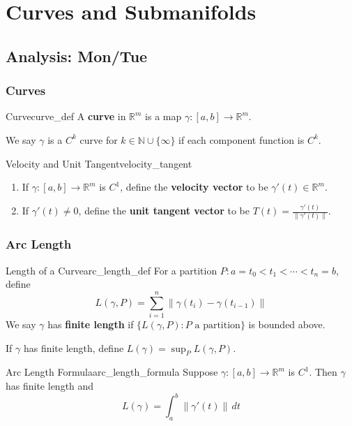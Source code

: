 \documentclass[11pt, letterpaper, openany]{book}
\begin{document}
\chapter{Curves and Submanifolds}

\section{Analysis: Mon/Tue}

\subsection{Curves}

\begin{defn}{Curve}{curve_def}
A \textbf{curve} in $\mathbb{R}^m$ is a map $\gamma: [a,b] \to \mathbb{R}^m$.

We say $\gamma$ is a $C^k$ curve for $k \in \mathbb{N} \cup \{\infty\}$ if each component function is $C^k$.
\end{defn}

\begin{defn}{Velocity and Unit Tangent}{velocity_tangent}
\begin{enumerate}
    \item If $\gamma: [a,b] \to \mathbb{R}^m$ is $C^1$, define the \textbf{velocity vector} to be $\gamma'(t) \in \mathbb{R}^m$.
    \item If $\gamma'(t) \neq 0$, define the \textbf{unit tangent vector} to be $T(t) = \frac{\gamma'(t)}{\|\gamma'(t)\|}$.
\end{enumerate}
\end{defn}

\subsection{Arc Length}

\begin{defn}{Length of a Curve}{arc_length_def}
For a partition $P: a = t_0 < t_1 < \cdots < t_n = b$, define
\[L(\gamma, P) = \sum_{i=1}^n \|\gamma(t_i) - \gamma(t_{i-1})\|\]
We say $\gamma$ has \textbf{finite length} if $\{L(\gamma, P) : P \text{ a partition}\}$ is bounded above.

If $\gamma$ has finite length, define $L(\gamma) = \sup_P L(\gamma, P)$.
\end{defn}

\begin{thm}{Arc Length Formula}{arc_length_formula}
Suppose $\gamma: [a,b] \to \mathbb{R}^m$ is $C^1$. Then $\gamma$ has finite length and
\[L(\gamma) = \int_a^b \|\gamma'(t)\| \, dt\]
\end{thm}
\end{document}
